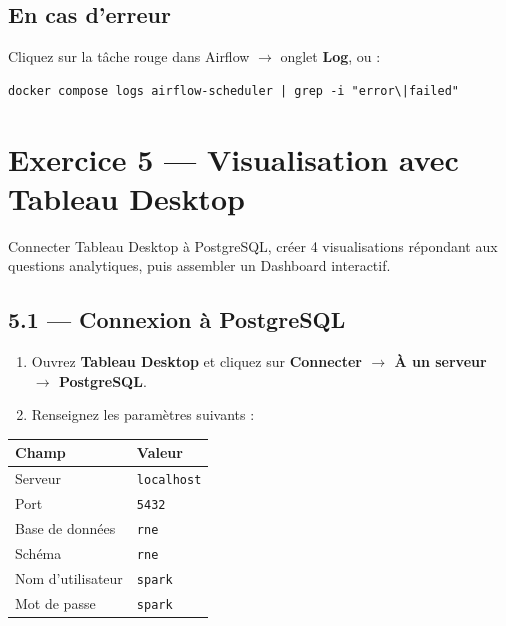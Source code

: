 \documentclass[11pt,a4paper]{article}
\begin{document}
\subsection*{En cas d'erreur}

Cliquez sur la tâche rouge dans Airflow $\to$ onglet \textbf{Log}, ou :
\begin{lstlisting}[style=bash, numbers=none]
docker compose logs airflow-scheduler | grep -i "error\|failed"
\end{lstlisting}

\section{Exercice 5 — Visualisation avec Tableau Desktop}

\begin{objectif}
Connecter Tableau Desktop à PostgreSQL, créer 4 visualisations répondant aux questions analytiques, puis assembler un Dashboard interactif.
\end{objectif}

\subsection*{5.1 — Connexion à PostgreSQL}

\begin{enumerate}[leftmargin=*]
  \item Ouvrez \textbf{Tableau Desktop} et cliquez sur \textbf{Connecter $\to$ À un serveur $\to$ PostgreSQL}.
  \item Renseignez les paramètres suivants :
\end{enumerate}

\begin{center}
\begin{tabular}{ll}
  \toprule
  \textbf{Champ}     & \textbf{Valeur} \\
  \midrule
  Serveur            & \texttt{localhost} \\
  Port               & \texttt{5432} \\
  Base de données    & \texttt{rne} \\
  Schéma             & \texttt{rne} \\
  Nom d'utilisateur  & \texttt{spark} \\
  Mot de passe       & \texttt{spark} \\
  \bottomrule
\end{tabular}
\end{center}
\end{document}
